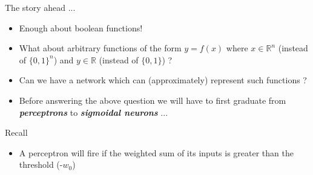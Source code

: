 \begin{frame}
\end{frame}

\begin{frame}
	\begin{block}{The story ahead ...}
		\begin{itemize}\justifying
			\item<1-> Enough about boolean functions!
			\item<2-> What about arbitrary functions of the form $y=f(x)$ where $x\in \mathbb{R}^n$ (instead of $\{0, 1\}^n$) and $y \in \mathbb{R}$ (instead of $\{0, 1\}$) ?
			\item<3-> Can we have a network which can (approximately) represent such functions ?
			\item<4-> Before answering the above question we will have to first graduate from \textbf{\textit{perceptrons}} to \textbf{\textit{sigmoidal neurons}} ...
		\end{itemize}
	\end{block}
\end{frame}

\begin{frame}
	\begin{block}{Recall}
		\begin{itemize}\justifying
			\item A perceptron will fire if the weighted sum of its inputs is greater than the threshold (-$w_0$)
		\end{itemize}
	\end{block}
\end{frame}

